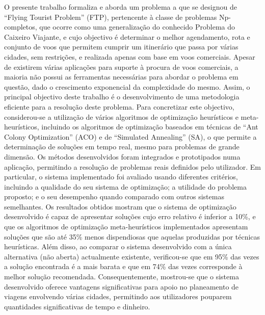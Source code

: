 \noindent O presente trabalho formaliza e aborda um problema a que se designou de 
“Flying Tourist Problem” (FTP), pertencente à classe de problemas 
Np-completos, que ocorre como uma generalização do conhecido Problema do 
Caixeiro Viajante, e cujo objectivo é determinar o melhor agendamento, 
rota e conjunto de voos que permitem cumprir um itinerário que passa por 
várias cidades, sem restrições, e realizada apenas com base em voos 
comerciais. Apesar de existirem várias aplicações para suporte à procura 
de voos comerciais, a maioria não possui as ferramentas necessárias para 
abordar o problema em questão, dado o crescimento exponencial da 
complexidade do mesmo. Assim, o principal objectivo deste trabalho é o 
desenvolvimento de uma metodologia eficiente para a resolução deste 
problema. Para concretizar este objectivo, considerou-se a utilização de 
vários algoritmos de optimização heurísticos e meta-heurísticos, 
incluindo os algoritmos de optimização baseados em técnicas de “Ant 
Colony Optimization” (ACO) e de “Simulated Annealing” (SA), o que 
permite a determinação de soluções em tempo real, mesmo para problemas 
de grande dimensão. Os métodos desenvolvidos foram integrados e 
prototipados numa aplicação, permitindo a resolução de problemas reais 
definidos pelo utilizador. Em particular, o sistema implementado foi 
avaliado usando diferentes critérios, incluindo a qualidade do seu 
sistema de optimização; a utilidade do problema proposto; e o seu 
desempenho quando comparado com outros sistemas semelhantes. Os 
resultados obtidos mostram que o sistema de optimização desenvolvido é 
capaz de apresentar soluções cujo erro relativo é inferior a 10\%, e que 
os algoritmos de optimização meta-heurísticos implementados apresentam 
soluções que são até 35\% menos dispendiosas que aquelas produzidas por 
técnicas heurísticas. Além disso, ao comparar o sistema desenvolvido com 
a única alternativa (não aberta) actualmente existente, verificou-se que 
em 95\% das vezes a solução encontrada é a mais barata e que em 74\% das 
vezes corresponde à melhor solução recomendada. Consequentemente, 
mostrou-se que o sistema  desenvolvido oferece vantagens significativas 
para apoio no planeamento de viagens envolvendo várias cidades, 
permitindo aos utilizadores pouparem quantidades significativas de tempo 
e dinheiro.